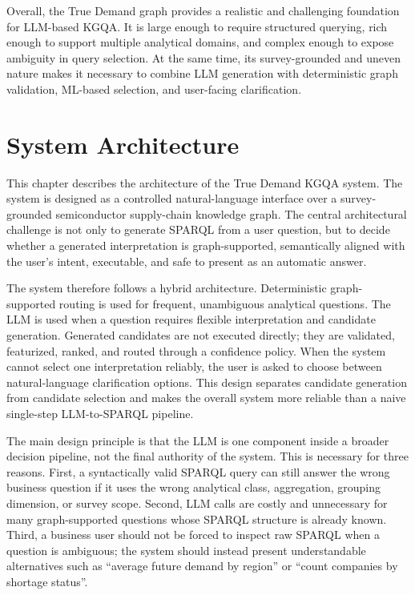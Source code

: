 \documentclass[
  12pt,
  english,
  oneside]{report}
\begin{document}
Overall, the True Demand graph provides a realistic and challenging foundation for LLM-based KGQA. It is large enough to require structured querying, rich enough to support multiple analytical domains, and complex enough to expose ambiguity in query selection. At the same time, its survey-grounded and uneven nature makes it necessary to combine LLM generation with deterministic graph validation, ML-based selection, and user-facing clarification.





\chapter{System Architecture}
\label{chap:system-architecture}

This chapter describes the architecture of the True Demand KGQA system. The system is designed as a controlled natural-language interface over a survey-grounded semiconductor supply-chain knowledge graph. The central architectural challenge is not only to generate SPARQL from a user question, but to decide whether a generated interpretation is graph-supported, semantically aligned with the user's intent, executable, and safe to present as an automatic answer.

The system therefore follows a hybrid architecture. Deterministic graph-supported routing is used for frequent, unambiguous analytical questions. The LLM is used when a question requires flexible interpretation and candidate generation. Generated candidates are not executed directly; they are validated, featurized, ranked, and routed through a confidence policy. When the system cannot select one interpretation reliably, the user is asked to choose between natural-language clarification options. This design separates candidate generation from candidate selection and makes the overall system more reliable than a naive single-step LLM-to-SPARQL pipeline.

The main design principle is that the LLM is one component inside a broader decision pipeline, not the final authority of the system. This is necessary for three reasons. First, a syntactically valid SPARQL query can still answer the wrong business question if it uses the wrong analytical class, aggregation, grouping dimension, or survey scope. Second, LLM calls are costly and unnecessary for many graph-supported questions whose SPARQL structure is already known. Third, a business user should not be forced to inspect raw SPARQL when a question is ambiguous; the system should instead present understandable alternatives such as ``average future demand by region'' or ``count companies by shortage status''.
\end{document}
